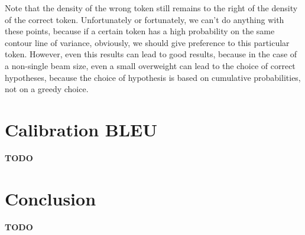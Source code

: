 \documentclass[a4paper,14pt]{extarticle}
\begin{document}
	Note that the density of the wrong token still remains to the right of the density of the correct token. Unfortunately or fortunately, we can't do anything with these points, because if a certain token has a high probability on the same contour line of variance, obviously, we should give preference to this particular token. However, even this results can lead to good results, because in the case of a non-single beam size, even a small overweight can lead to the choice of correct hypotheses, because the choice of hypothesis is based on cumulative probabilities, not on a greedy choice.
	\begin{figure}[H]
	\end{figure}
\section{Calibration BLEU}
	\textbf{TODO}
	
\section{Conclusion}
	\textbf{TODO}
	
\end{document}
